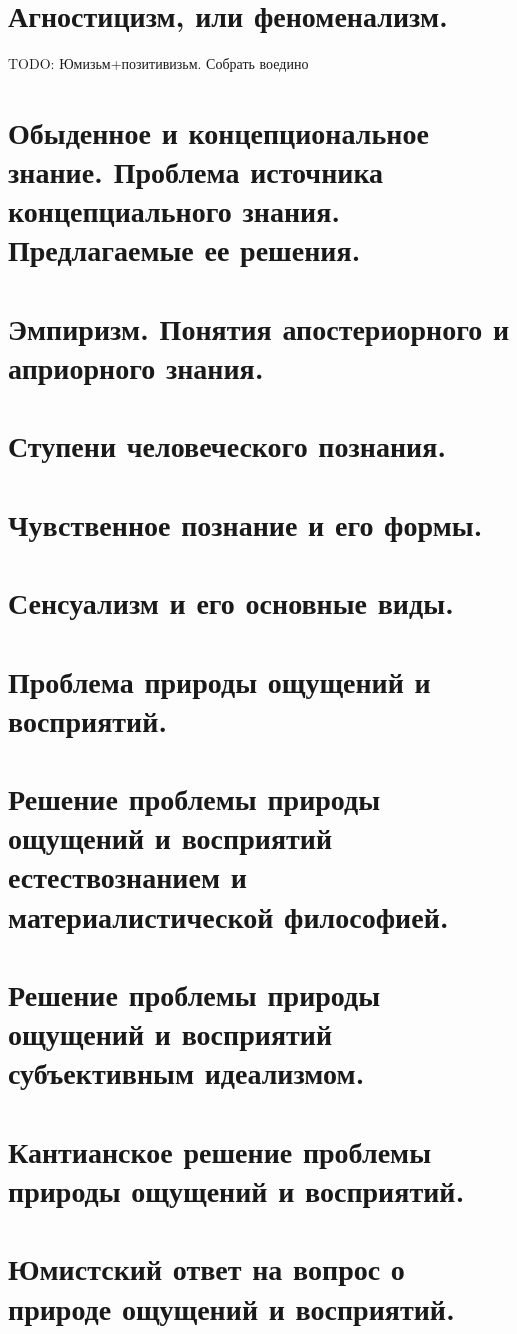 \section{ Агностицизм, или феноменализм.}
TODO: Юмизьм+позитивизьм. Собрать воедино

\section{ Обыденное и концепциональное знание. Проблема источника концепциального знания. Предлагаемые ее решения.}

\section{ Эмпиризм. Понятия апостериорного и априорного знания.}

\section{ Ступени человеческого познания.}
\section{ Чувственное познание и его формы.}
\section{ Сенсуализм и его основные виды.}
\section{ Проблема природы ощущений и восприятий.}
\section{ Решение проблемы природы ощущений и восприятий естествознанием и материалистической философией.}
\section{ Решение проблемы природы ощущений и восприятий субъективным идеализмом.}
\section{ Кантианское решение проблемы природы ощущений и восприятий.}
\section{ Юмистский ответ на вопрос о природе ощущений и восприятий.}
